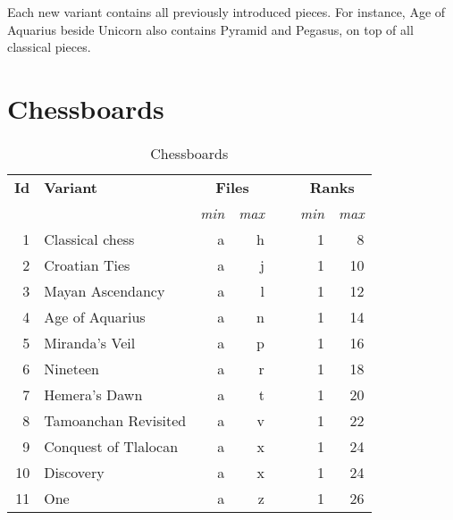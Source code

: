 Each new variant contains all previously introduced pieces. For instance, Age of Aquarius
beside Unicorn also contains Pyramid and Pegasus, on top of all classical pieces.

\clearpage %

\section*{Chessboards}
\label{sec:Appendix/Chessboards}

\begin{table}[!h]
\centering
\begin{tabular}{ rlrrcrr }
\toprule
\textbf{Id} & \textbf{Variant}      & \multicolumn{2}{c}{ \textbf{Files} } & ~ & \multicolumn{2}{c}{ \textbf{Ranks} }   \\ \cmidrule{3-4} \cmidrule{6-7}
            &                       & \emph{min} & \emph{max}              &   & \emph{min} & \emph{max}                \\
\midrule
          1 & Classical chess       & a          & h                       &   & 1          &  8                        \\ %
          2 & Croatian Ties         & a          & j                       &   & 1          & 10                        \\
          3 & Mayan Ascendancy      & a          & l                       &   & 1          & 12                        \\
          4 & Age of Aquarius       & a          & n                       &   & 1          & 14                        \\
          5 & Miranda's Veil        & a          & p                       &   & 1          & 16                        \\
          6 & Nineteen              & a          & r                       &   & 1          & 18                        \\
          7 & Hemera's Dawn         & a          & t                       &   & 1          & 20                        \\
          8 & Tamoanchan Revisited  & a          & v                       &   & 1          & 22                        \\
          9 & Conquest of Tlalocan  & a          & x                       &   & 1          & 24                        \\
         10 & Discovery             & a          & x                       &   & 1          & 24                        \\
         11 & One                   & a          & z                       &   & 1          & 26                        \\
\bottomrule
\end{tabular}
\caption{Chessboards}
\label{tbl:Appendix/Chessboards}
\end{table}

